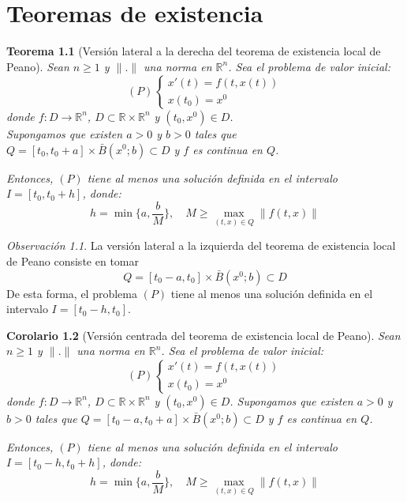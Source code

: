 \documentclass{report}
\newtheorem{theorem}{Teorema}[chapter]
\newtheorem{corollary}[theorem]{Corolario}
\theoremstyle{remark}
\newtheorem*{remark}{Observación}
\theoremstyle{remark}
\theoremstyle{remark}
\theoremstyle{definition}
\theoremstyle{definition}
\theoremstyle{definition}
\begin{document}
\chapter{Teoremas de existencia}
\begin{theorem}[Versión lateral a la derecha del teorema de existencia local de Peano]
    Sean $n \geq 1$ y $\|.\|$ una norma en $\mathbb{R}^n$.
    Sea el problema de valor inicial:
    $$(P) \begin{cases}
            x'(t) = f(t, x(t)) \\
            x(t_0) = x^0
        \end{cases}$$
    donde $f: D \to \mathbb{R}^n$, $D \subset \mathbb{R} \times \mathbb{R}^n$ y $(t_0, x^0) \in D$.\\
    Supongamos que existen $a > 0$ y $b > 0$ tales que $Q = [t_0, t_0 + a] \times \bar{B}(x^0; b) \subset D$ y $f$ es continua en $Q$.

    Entonces, $(P)$ tiene al menos una solución definida en el intervalo $I = [t_0, t_0 + h]$, donde:
    $$h = \min\{a, \frac{b}{M}\}, \quad M \geq \max_{(t, x) \in Q} \|f(t, x)\|$$
\end{theorem}

\begin{remark}
    La versión lateral a la izquierda del teorema de existencia local de Peano consiste en tomar
    $$Q = [t_0 - a, t_0] \times \bar{B}(x^0; b) \subset D$$
    De esta forma, el problema $(P)$ tiene al menos una solución definida en el intervalo $I = [t_0 - h, t_0]$.
\end{remark}

\begin{corollary}[Versión centrada del teorema de existencia local de Peano]
    Sean $n \geq 1$ y $\|.\|$ una norma en $\mathbb{R}^n$.
    Sea el problema de valor inicial:
    $$(P) \begin{cases}
            x'(t) = f(t, x(t)) \\
            x(t_0) = x^0
        \end{cases}$$
    donde $f: D \to \mathbb{R}^n$, $D \subset \mathbb{R} \times \mathbb{R}^n$ y $(t_0, x^0) \in D$.
    Supongamos que existen $a > 0$ y $b > 0$ tales que $Q = [t_0 - a, t_0 + a] \times \bar{B}(x^0; b) \subset D$ y $f$ es continua en $Q$.

    Entonces, $(P)$ tiene al menos una solución definida en el intervalo $I = [t_0 - h, t_0 + h]$, donde:
    $$h = \min\{a, \frac{b}{M}\}, \quad M \geq \max_{(t, x) \in Q} \|f(t, x)\|$$
\end{corollary}
\end{document}
